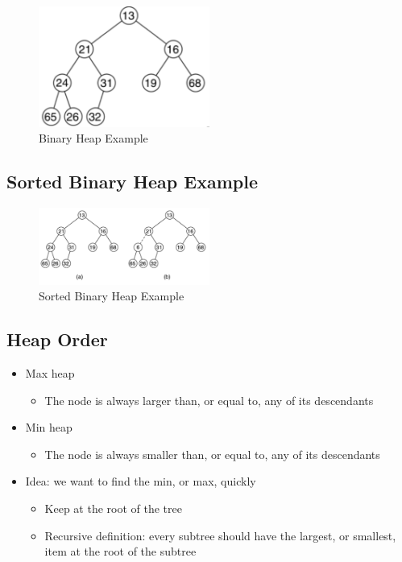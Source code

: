 \documentclass[
  10pt,
  english,
  letterpaper,
,tablecaptionabove
]{scrartcl}
\providecommand{\tightlist}{%
  \setlength{\itemsep}{0pt}\setlength{\parskip}{0pt}}
\begin{document}
\begin{figure}
\centering
\includegraphics[width=0.5\textwidth,height=\textheight]{images/2.png}
\caption{Binary Heap Example}
\end{figure}

\hypertarget{sorted-binary-heap-example}{%
\subsection{Sorted Binary Heap
Example}\label{sorted-binary-heap-example}}

\begin{figure}
\centering
\includegraphics[width=0.5\textwidth,height=\textheight]{images/3.png}
\caption{Sorted Binary Heap Example}
\end{figure}

\hypertarget{heap-order}{%
\subsection{Heap Order}\label{heap-order}}

\begin{itemize}
\tightlist
\item
  Max heap

  \begin{itemize}
  \tightlist
  \item
    The node is always larger than, or equal to, any of its descendants
  \end{itemize}
\item
  Min heap

  \begin{itemize}
  \tightlist
  \item
    The node is always smaller than, or equal to, any of its descendants
  \end{itemize}
\item
  Idea: we want to find the min, or max, quickly

  \begin{itemize}
  \tightlist
  \item
    Keep at the root of the tree
  \item
    Recursive definition: every subtree should have the largest, or
    smallest, item at the root of the subtree
  \end{itemize}
\end{itemize}
\end{document}
